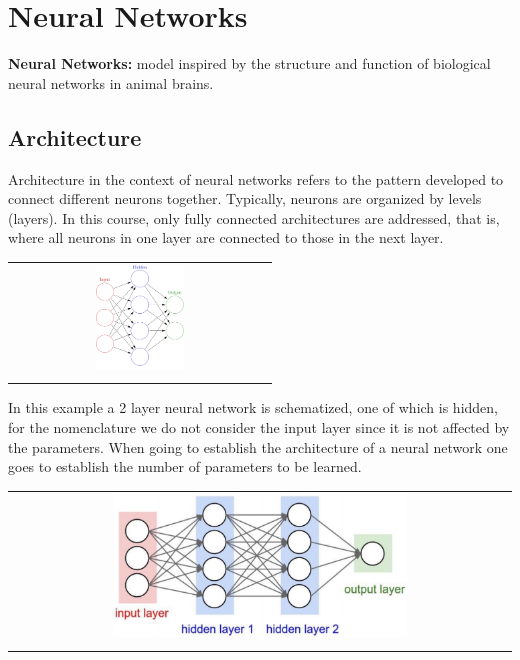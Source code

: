\section{Neural Networks}

\begin{mdframed}
    \textbf{Neural Networks:} model inspired by the structure and function of biological neural networks in animal brains.
\end{mdframed}

\subsection{Architecture}
Architecture in the context of neural networks refers to the pattern developed to connect different neurons together.  Typically, neurons are organized by levels (layers).  In this course, only fully connected architectures are addressed, that is, where all neurons in one layer are connected to those in the next layer.
\begin{center}
    \begin{tabular}{c}
        \\ \includegraphics[width=0.35\textwidth]{images/NeuralNetworks1.png} \\ \\
    \end{tabular}
\end{center}
In this example a 2 layer neural network is schematized, one of which is hidden, for the nomenclature we do not consider the input layer since it is not affected by the parameters.  When going to establish the architecture of a neural network one goes to establish the number of parameters to be learned.
\begin{center}
    \begin{tabular}{c}
        \\ \includegraphics[width=0.6\textwidth]{images/NeuralNetworks2.png} \\ \\
    \end{tabular}
\end{center}
